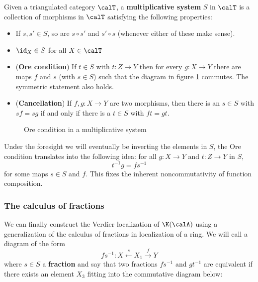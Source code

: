 \documentclass[12pt]{article}
\begin{document}
\begin{defn}
	Given a triangulated category $\calT$, a \textbf{multiplicative system} $S$ in $\calT$ is a collection of morphisms 
	in $\calT$ satisfying the following properties:
	\begin{itemize}
		\item If $s,s'\in S$, so are $s\circ s'$ and $s'\circ s$ (whenever either of these make sense).
		\item $\id_X\in S$ for all $X\in\calT$
		\item (\textbf{Ore condition}) If $t\in S$ with $t:Z\to Y$ then for every $g:X\to Y$ there are maps $f$ and $s$ (with $s\in S$) such that the diagram in figure \ref{fig:fractions} commutes. The symmetric statement also holds.
		\item (\textbf{Cancellation}) If $f,g:X\to Y$ are two morphisms, then there is an $s\in S$ with $sf=sg$ if and only if there is a $t\in S$ with $ft=gt$.
	\end{itemize}
\end{defn}
\begin{figure}
	\centering
	\caption{Ore condition in a multiplicative system}
	\label{fig:fractions}
\end{figure}
\begin{rmk}
	Under the foresight we will eventually be inverting the elements in $S$, the Ore condition translates into the following idea: for all $g:X\to Y$ and $t:Z\to Y$ in $S$,
	\[t^{-1}g=fs^{-1}\]
	for some maps $s\in S$ and $f$. This fixes the inherent noncommutativity of function composition.
\end{rmk}
\subsubsection*{The calculus of fractions}
We can finally construct the Verdier localization of $\K(\calA)$ using a generalization of the calculus of 
fractions in localization of a ring. We will call a diagram of the form 
\[fs^{-1}:X\xleftarrow{s} X_1\xrightarrow{f} Y\]
where $s\in S$ a \textbf{fraction} and say that two fractions $fs^{-1}$ and $gt^{-1}$ are equivalent if there exists an element $X_3$ fitting 
into the commutative diagram below:
\begin{center}
\end{center}
\end{document}
